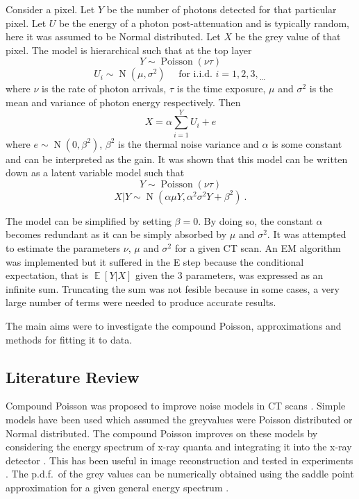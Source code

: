 \documentclass[a4paper]{proc}
\DeclareMathOperator{\expectation}{\mathbb{E}}
\DeclareMathOperator{\normal}{N}
\DeclareMathOperator{\poisson}{Poisson}
\newcommand{\dotdotdot}{_{\phantom{.}\cdots}}
\begin{document}
Consider a pixel. Let $Y$ be the number of photons detected for that particular pixel. Let $U$ be the energy of a photon post-attenuation and is typically random, here it was assumed to be Normal distributed. Let $X$ be the grey value of that pixel. The model is hierarchical such that at the top layer
\begin{equation}
Y\sim\poisson\left(\nu\tau\right)
\end{equation}
\begin{equation}
U_i\sim\normal\left(\mu,\sigma^2\right) \quad \text{ for i.i.d. }i=1,2,3,\dotdotdot
\end{equation}
where $\nu$ is the rate of photon arrivals, $\tau$ is the time exposure, $\mu$ and $\sigma^2$ is the mean and variance of photon energy respectively. Then
\begin{equation}
X = \alpha\sum_{i=1}^Y U_i + e
\end{equation}
where $e\sim\normal(0,\beta^2)$, $\beta^2$ is the thermal noise variance and $\alpha$ is some constant and can be interpreted as the gain. It was shown that this model can be written down as a latent variable model such that 
\begin{equation}
Y\sim\poisson\left(\nu\tau\right)
\end{equation}
\begin{equation}
X|Y\sim\normal\left(\alpha\mu Y, \alpha^2\sigma^2 Y + \beta^2\right) \ .
\end{equation}

The model can be simplified by setting $\beta=0$. By doing so, the constant $\alpha$ becomes redundant as it can be simply absorbed by $\mu$ and $\sigma^2$. It was attempted to estimate the parameters $\nu$, $\mu$ and $\sigma^2$ for a given CT scan. An EM algorithm \cite{dempster1977maximum} was implemented but it suffered in the E step because the conditional expectation, that is $\expectation\left[Y|X\right]$ given the 3 parameters, was expressed as an infinite sum. Truncating the sum was not fesible because in some cases, a very large number of terms were needed to produce accurate results.

The main aims were to investigate the compound Poisson, approximations and methods for fitting it to data.

\subsection{Literature Review}
Compound Poisson was proposed to improve noise models in CT scans \cite{whiting2002signal}. Simple models have been used which assumed the greyvalues were Poisson distributed or Normal \cite{lu2002analytical} distributed. The compound Poisson improves on these models by considering the energy spectrum of x-ray quanta and integrating it into the x-ray detector \cite{whiting2006properties}. This has been useful in image reconstruction \cite{elbakri2003efficient}\cite{elbakri2002statistical}\cite{elbakri2001statistical}\cite{lasio2007statistical} and tested in experiments \cite{wang2008experimental}. The p.d.f.~of the grey values can be numerically obtained using the saddle point approximation for a given general energy spectrum \cite{elbakri2003efficient}.
\end{document}
